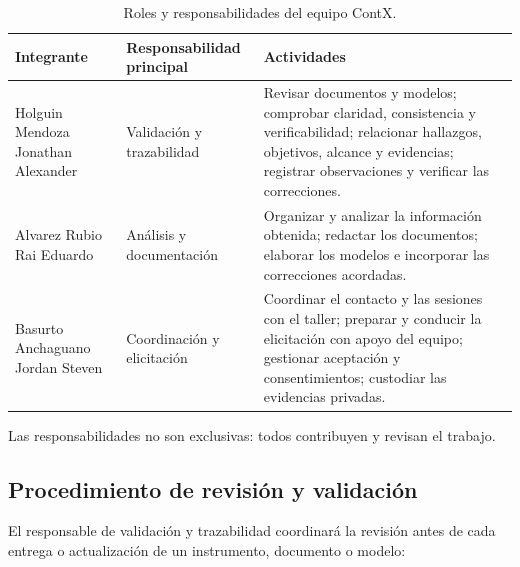 \begin{table}[H]
\centering\small
\caption{Roles y responsabilidades del equipo ContX.}\label{tab:roles}
\noindent\begin{tabularx}{\linewidth}{@{}L{3.6cm}L{3.2cm}Y@{}}
\toprule
\textbf{Integrante} & \textbf{Responsabilidad principal} & \textbf{Actividades} \\
\midrule
Holguin Mendoza Jonathan Alexander & Validación y trazabilidad & Revisar documentos y modelos; comprobar claridad, consistencia y verificabilidad; relacionar hallazgos, objetivos, alcance y evidencias; registrar observaciones y verificar las correcciones. \\
Alvarez Rubio Rai Eduardo & Análisis y documentación & Organizar y analizar la información obtenida; redactar los documentos; elaborar los modelos e incorporar las correcciones acordadas. \\
Basurto Anchaguano Jordan Steven & Coordinación y elicitación & Coordinar el contacto y las sesiones con el taller; preparar y conducir la elicitación con apoyo del equipo; gestionar aceptación y consentimientos; custodiar las evidencias privadas. \\
\bottomrule
\end{tabularx}
\end{table}


Las responsabilidades no son exclusivas: todos contribuyen y revisan el trabajo.

\subsection{Procedimiento de revisión y validación}
\label{sec:revision-entregables}

El responsable de validación y trazabilidad coordinará la revisión antes de cada entrega o actualización de un instrumento, documento o modelo:


